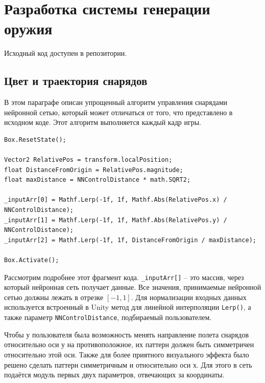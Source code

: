 ﻿%
\section{Разработка системы генерации оружия}

Исходный код доступен в репозитории\cite{s7}.

\subsection{Цвет и траектория снарядов}

В этом параграфе описан упрощенный алгоритм управления снарядами нейронной сетью, который может отличаться от того, что представлено в исходном коде. Этот алгоритм выполняется каждый кадр игры.


\begin{lstlisting}[name=Projectile, caption={Projectile. Part 1}]
Box.ResetState(); 

Vector2 RelativePos = transform.localPosition;
float DistanceFromOrigin = RelativePos.magnitude;
float maxDistance = NNControlDistance * math.SQRT2;

_inputArr[0] = Mathf.Lerp(-1f, 1f, Mathf.Abs(RelativePos.x) / NNControlDistance);
_inputArr[1] = Mathf.Lerp(-1f, 1f, Mathf.Abs(RelativePos.y) / NNControlDistance);
_inputArr[2] = Mathf.Lerp(-1f, 1f, DistanceFromOrigin / maxDistance);
            
Box.Activate();

\end{lstlisting}

Рассмотрим подробнее этот фрагмент кода. \lstinline{_inputArr[]} -- это массив, через который нейронная сеть получает данные. Все значения, принимаемые нейронной сетью должны лежать в отрезке $[-1,1]$. Для нормализации входных данных используется встроенный в Unity метод для линейной интерполяции \lstinline{Lerp()}, а также параметр \lstinline{NNControlDistance}, подбираемый пользователем.

Чтобы у пользователя была возможность менять направление полета снарядов относительно оси у на противоположное, их паттерн должен быть симметричен относительно этой оси. Также для более приятного визуального эффекта было решено сделать паттерн симметричным и относительно оси х. Для этого в сеть подаётся модуль первых двух параметров, отвечающих за координаты.


